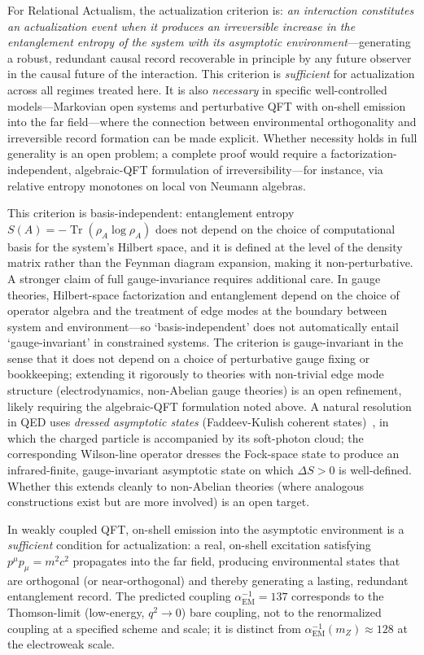 \documentclass[11pt,a4paper]{article}
\theoremstyle{plain}
\theoremstyle{definition}
\theoremstyle{remark}
\begin{document}
For Relational Actualism, the actualization criterion is: \emph{an interaction
constitutes an actualization event when it produces an irreversible increase in
the entanglement entropy of the system with its asymptotic environment}---generating
a robust, redundant causal record recoverable in principle by any future observer
in the causal future of the interaction. This criterion is \emph{sufficient} for
actualization across all regimes treated here. It is also \emph{necessary} in
specific well-controlled models---Markovian open systems and perturbative QFT with
on-shell emission into the far field---where the connection between environmental
orthogonality and irreversible record formation can be made explicit. Whether
necessity holds in full generality is an open problem; a complete proof would
require a factorization-independent, algebraic-QFT formulation of
irreversibility---for instance, via relative entropy monotones on local von Neumann
algebras.

This criterion is basis-independent: entanglement entropy $S(A) = -\operatorname{Tr}(\rho_A
\log \rho_A)$ does not depend on the choice of computational basis for the
system's Hilbert space, and it is defined at the level of the density matrix
rather than the Feynman diagram expansion, making it non-perturbative. A stronger
claim of full gauge-invariance requires additional care. In gauge theories,
Hilbert-space factorization and entanglement depend on the choice of operator
algebra and the treatment of edge modes at the boundary between system and
environment---so `basis-independent' does not automatically entail `gauge-invariant'
in constrained systems. The criterion is gauge-invariant in the sense that it does
not depend on a choice of perturbative gauge fixing or bookkeeping; extending it
rigorously to theories with non-trivial edge mode structure (electrodynamics,
non-Abelian gauge theories) is an open refinement, likely requiring the
algebraic-QFT formulation noted above.
A natural resolution in QED uses \emph{dressed asymptotic states}
(Faddeev-Kulish coherent states)~\citep{Kulish1970}, in which the
charged particle is accompanied by its soft-photon cloud; the
corresponding Wilson-line operator dresses the Fock-space state to produce
an infrared-finite, gauge-invariant asymptotic state on which $\Delta S > 0$
is well-defined. Whether this extends cleanly to non-Abelian theories
(where analogous constructions exist but are more involved) is an open target.

In weakly coupled QFT, on-shell emission into the asymptotic environment is a
\emph{sufficient} condition for actualization: a real, on-shell excitation
satisfying $p^{\mu}p_{\mu} = m^{2}c^{2}$ propagates into the far field, producing
environmental states that are orthogonal (or near-orthogonal) and thereby
generating a lasting, redundant entanglement record.
The predicted coupling $\alpha_{\mathrm{EM}}^{-1} = 137$ corresponds to the
Thomson-limit (low-energy, $q^2\to 0$) bare coupling, not to the
renormalized coupling at a specified scheme and scale; it is distinct
from $\alpha_{\mathrm{EM}}^{-1}(m_Z) \approx 128$ at the electroweak scale.
\end{document}
